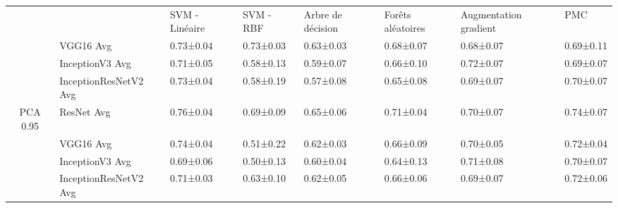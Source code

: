 \begin{landscape}
\begin{table}[]
\begin{tabular}{clllllll}
\multicolumn{1}{l}{}        &                                    & SVM - Linéaire                             & SVM - RBF                         & Arbre de décision                 & Forêts aléatoires                 & Augmentation gradient             & PMC                               \\
                            & VGG16 Avg                          & 0.73±0.04                                  & 0.73±0.03                         & 0.63±0.03                         & 0.68±0.07                         & 0.68±0.07                         & 0.69±0.11                         \\
                            & InceptionV3 Avg                    & 0.71±0.05                                  & 0.58±0.13                         & 0.59±0.07                         & 0.66±0.10                         & 0.72±0.07                         & 0.69±0.07                         \\
                            & InceptionResNetV2 Avg              & 0.73±0.04                                  & 0.58±0.19                         & 0.57±0.08                         & 0.65±0.08                         & 0.69±0.07                         & 0.70±0.07                         \\
\multirow{-4}{*}{PCA 0.95}  & ResNet Avg                         & 0.76±0.04                                  & 0.69±0.09                         & 0.65±0.06                         & 0.71±0.04                         & 0.70±0.07                         & 0.74±0.07                         \\
                            & VGG16 Avg                          & 0.74±0.04                                  & 0.51±0.22                         & 0.62±0.03                         & 0.66±0.09                         & 0.70±0.05                         & 0.72±0.04                         \\
                            & InceptionV3 Avg                    & 0.69±0.06                                  & 0.50±0.13                         & 0.60±0.04                         & 0.64±0.13                         & 0.71±0.08                         & 0.70±0.07                         \\
                            & InceptionResNetV2 Avg              & 0.71±0.03                                  & 0.63±0.10                         & 0.62±0.05                         & 0.66±0.06                         & 0.69±0.07                         & 0.72±0.06                         \\

\end{tabular}
\end{table}
\end{landscape}
